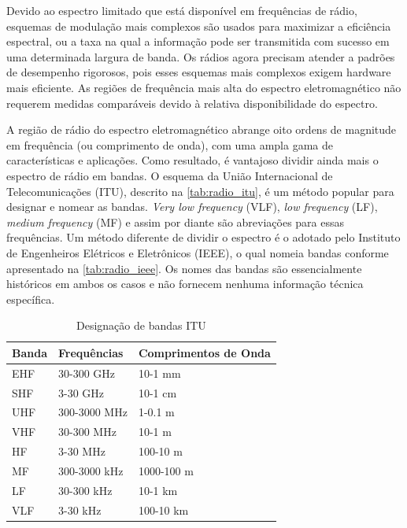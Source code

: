 \documentclass[
	12pt,				%
	openright,			%
	twoside,			%
	a4paper,			%
	english,			%
	french,				%
	spanish,			%
	brazil				%
	]{abntex2}
\begin{document}
Devido ao espectro limitado que está disponível em frequências de rádio, esquemas de modulação mais complexos são usados para maximizar a eficiência espectral, ou a taxa na qual a informação pode ser transmitida com sucesso em uma determinada largura de banda. Os rádios agora precisam atender a padrões de desempenho rigorosos, pois esses esquemas mais complexos exigem hardware mais eficiente. As regiões de frequência mais alta do espectro eletromagnético não requerem medidas comparáveis devido à relativa disponibilidade do espectro.

A região de rádio do espectro eletromagnético abrange oito ordens de magnitude em frequência (ou comprimento de onda), com uma ampla gama de características e aplicações. Como resultado, é vantajoso dividir ainda mais o espectro de rádio em bandas. O esquema da União Internacional de Telecomunicações (ITU), descrito na \autoref{tab:radio_itu}, é um método popular para designar e nomear as bandas. \emph{Very low frequency} (VLF), \emph{low frequency} (LF), \emph{medium frequency} (MF) e assim por diante são abreviações para essas frequências. Um método diferente de dividir o espectro é o adotado pelo Instituto de Engenheiros Elétricos e Eletrônicos (IEEE), o qual nomeia bandas conforme apresentado na \autoref{tab:radio_ieee}. Os nomes das bandas são essencialmente históricos em ambos os casos e não fornecem nenhuma informação técnica específica.

\begin{table}[H]
\centering
\caption{Designação de bandas ITU}
\label{tab:radio_itu}
\begin{tabular}{|l|l|l|} 
\hline
\textbf{Banda} & \textbf{Frequências} & \textbf{Comprimentos de Onda}  \\ 
\hline
EHF            & 30-300 GHz           & 10-1 mm                        \\
SHF            & 3-30 GHz             & 10-1 cm                        \\
UHF            & 300-3000 MHz         & 1-0.1 m                        \\
VHF            & 30-300 MHz           & 10-1 m                         \\
HF             & 3-30 MHz             & 100-10 m                       \\
MF             & 300-3000 kHz         & 1000-100 m                     \\
LF             & 30-300 kHz           & 10-1 km                        \\
VLF            & 3-30 kHz             & 100-10 km                      \\
\hline
\end{tabular}
\end{table}
\end{document}
